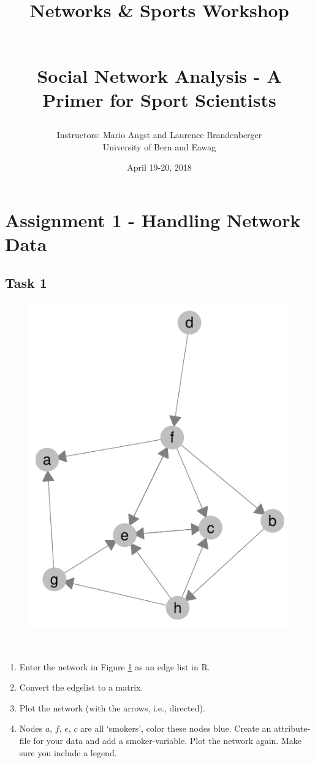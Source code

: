 \documentclass[12pt,a4paper]{article} %
\title{\begin{large}Networks \& Sports Workshop\end{large}\\[1cm] Social Network Analysis - A Primer for Sport Scientists}
\author{Instructors: Mario Angst and Laurence Brandenberger\\University of Bern and Eawag}
\date{April 19-20, 2018}
\begin{document}
\maketitle

%
\section{Assignment 1 - Handling Network Data}

\subsection{Task 1}

\begin{figure}[!hbt]
\begin{center}
\includegraphics[width = .6\textwidth]{randNW_directed.pdf}
\end{center}
~\label{rdn}
\end{figure}

\begin{enumerate}
	\item Enter the network in Figure \ref{rdn} as an edge list in R.
	\item Convert the edgelist to a matrix.
	\item Plot the network (with the arrows, i.e., directed).
	\item Nodes $a$, $f$, $e$, $c$ are all `smokers', color these nodes blue. Create an attribute-file for your data and add a smoker-variable. Plot the network again. Make sure you include a legend.
\end{enumerate}
\end{document}

